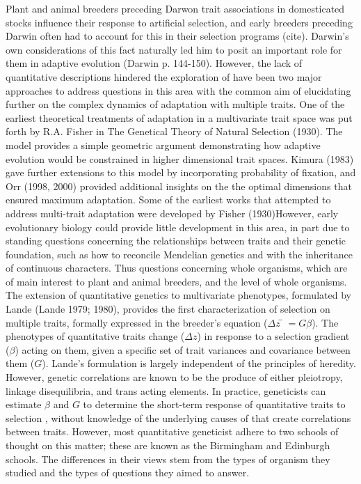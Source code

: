 \documentclass{article}
\begin{document}
Plant and animal breeders preceding Darwon trait associations in domesticated stocks influence their response to artificial selection, and early breeders preceding Darwin often had to account for this in their selection programs (cite).  Darwin’s own considerations of this fact naturally led him to posit an important role for them in adaptive evolution (Darwin p. 144-150).  However, the lack of quantitative descriptions hindered the exploration of have been two major approaches to address questions in this area with the common aim of elucidating further on the complex dynamics of adaptation with multiple traits. One of the earliest theoretical treatments of adaptation in a multivariate trait space was put forth by R.A. Fisher in The Genetical Theory of Natural Selection (1930). The model provides a simple geometric argument demonstrating how adaptive evolution would be constrained in higher dimensional trait spaces.  Kimura (1983) gave further extensions to this model by incorporating probability of fixation, and Orr (1998, 2000) provided additional insights on the the optimal dimensions that ensured maximum adaptation.  Some of the earliest works that attempted to address multi-trait adaptation were developed by Fisher (1930)However, early evolutionary biology could provide little development in this area, in part due to standing questions concerning the relationships between traits and their genetic foundation, such as how to reconcile Mendelian genetics and with the inheritance of continuous characters. Thus questions concerning whole organisms, which are of main interest to plant and animal breeders, and the level of whole organisms. The extension of quantitative genetics to multivariate phenotypes, formulated by Lande (Lande 1979; 1980), provides the first characterization of selection on multiple traits, formally expressed in the breeder’s equation ($\Delta z ̅=G \beta$). The phenotypes of quantitative traits change ($\Delta z$) in response to a selection gradient ($\beta$) acting on them, given a specific set of trait variances and covariance between them ($G$). Lande’s formulation is largely independent of the principles of heredity.  However, genetic correlations are known to be the produce of either pleiotropy, linkage disequilibria, and trans acting elements.  In practice, geneticists can estimate $\beta$ and $G$ to determine the short-term response of quantitative traits to selection \cite{lynch1998genetics}, without knowledge of the underlying causes of that create correlations between traits.  However, most quantitative geneticist adhere to two schools of thought on this matter; these are known as the Birmingham and Edinburgh schools.  The differences in their views stem from the types of organism they studied and the types of questions they aimed to answer.
\end{document}
